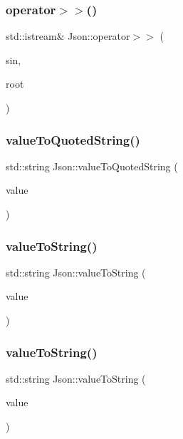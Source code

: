 \subsubsection{\texorpdfstring{operator$>$$>$()}{operator>>()}}
{\footnotesize\ttfamily std\+::istream\& Json\+::operator$>$$>$ (\begin{DoxyParamCaption}\item[{std\+::istream \&}]{sin,  }\item[{Value \&}]{root }\end{DoxyParamCaption})}

\mbox{\label{namespace_json_aa0c8235a4a5c6599da5d3332743db8ac}} 
\subsubsection{\texorpdfstring{value\+To\+Quoted\+String()}{valueToQuotedString()}}
{\footnotesize\ttfamily std\+::string Json\+::value\+To\+Quoted\+String (\begin{DoxyParamCaption}\item[{const char $\ast$}]{value }\end{DoxyParamCaption})}

\mbox{\label{namespace_json_abd9c650f70d9434f98f9025e2e2faf2d}} 
\subsubsection{\texorpdfstring{value\+To\+String()}{valueToString()}\hspace{0.1cm}{\footnotesize\ttfamily [1/4]}}
{\footnotesize\ttfamily std\+::string Json\+::value\+To\+String (\begin{DoxyParamCaption}\item[{Largest\+Int}]{value }\end{DoxyParamCaption})}

\mbox{\label{namespace_json_a3f46b0bc62b95a9426a2da0117bdf9f0}} 
\subsubsection{\texorpdfstring{value\+To\+String()}{valueToString()}\hspace{0.1cm}{\footnotesize\ttfamily [2/4]}}
{\footnotesize\ttfamily std\+::string Json\+::value\+To\+String (\begin{DoxyParamCaption}\item[{Largest\+U\+Int}]{value }\end{DoxyParamCaption})}

